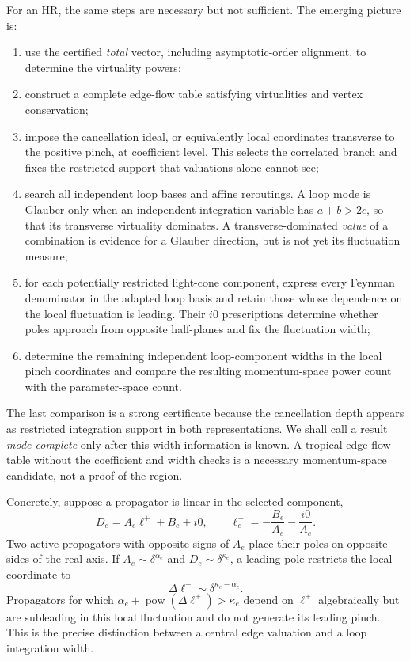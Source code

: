 \documentclass[a4paper,11pt]{article}
\begin{document}
For an HR, the same steps are necessary but not sufficient.  The emerging
picture is:
\begin{enumerate}[label=(\roman*)]
 \item use the certified \emph{total} vector, including asymptotic-order
 alignment, to determine the virtuality powers;
 \item construct a complete edge-flow table satisfying virtualities and
 vertex conservation;
 \item impose the cancellation ideal, or equivalently local coordinates
 transverse to the positive pinch, at coefficient level.  This selects the
 correlated branch and fixes the restricted support that valuations alone
 cannot see;
 \item search all independent loop bases and affine reroutings.  A loop mode
 is Glauber only when an independent integration variable has
 \(a+b>2c\), so that its transverse virtuality dominates.  A
 transverse-dominated \emph{value} of a combination is evidence for a
 Glauber direction, but is not yet its fluctuation measure;
 \item for each potentially restricted light-cone component, express every
 Feynman denominator in the adapted loop basis and retain those whose
 dependence on the local fluctuation is leading.  Their \(i0\) prescriptions
 determine whether poles approach from opposite half-planes and fix the
 fluctuation width;
 \item determine the remaining independent loop-component widths in the
 local pinch coordinates and compare the resulting momentum-space power
 count with the parameter-space count.
\end{enumerate}
The last comparison is a strong certificate because the cancellation depth
appears as restricted integration support in both representations.  We shall
call a result \emph{mode complete} only after this width information is
known.  A tropical edge-flow table without the coefficient and width checks
is a necessary momentum-space candidate, not a proof of the region.

Concretely, suppose a propagator is linear in the selected component,
\begin{equation}
 D_e=A_e\ell^+ +B_e+i0,
 \qquad
 \ell_e^+=-\frac{B_e}{A_e}-\frac{i0}{A_e}.
 \label{eq:light-cone-pole-rule}
\end{equation}
Two active propagators with opposite signs of \(A_e\) place their poles on
opposite sides of the real axis.  If
\(A_e\sim\delta^{\alpha_e}\) and
\(D_e\sim\delta^{\kappa_e}\), a leading pole restricts the local coordinate
to
\begin{equation}
 \Delta\ell^+\sim\delta^{\kappa_e-\alpha_e}.
 \label{eq:light-cone-pinch-width}
\end{equation}
Propagators for which
\(\alpha_e+\operatorname{pow}(\Delta\ell^+)>\kappa_e\) depend on
\(\ell^+\) algebraically but are subleading in this local fluctuation and do
not generate its leading pinch.  This is the precise distinction between a
central edge valuation and a loop integration width.
\end{document}

